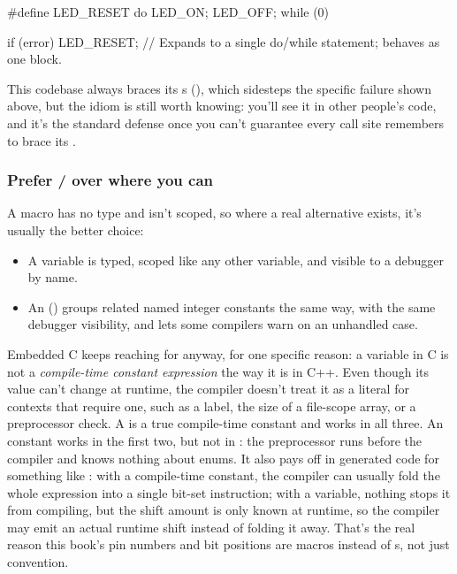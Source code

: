 \begin{ccode}
#define LED_RESET do { LED_ON; LED_OFF; } while (0)

if (error) LED_RESET; // Expands to a single do/while statement; behaves as one block.
\end{ccode}

\noindent This codebase always braces its s (), which sidesteps the
specific failure shown above, but the  idiom is still worth knowing:
you'll see it in other people's code, and it's the standard defense once you can't guarantee every
call site remembers to brace its .

\subsubsection{Prefer / over  where you can}
A macro has no type and isn't scoped, so where a real alternative exists, it's usually the better
choice:
\begin{itemize}
  \item A  variable is typed, scoped like any other variable, and visible to a debugger
    by name.
  \item An  () groups related named integer constants the same way, with
    the same debugger visibility, and lets some compilers warn on an unhandled  case.
\end{itemize}
Embedded C keeps reaching for  anyway, for one specific reason: a 
variable in C is not a \emph{compile-time constant expression} the way it is in C++. Even though
its value can't change at runtime, the compiler doesn't treat it as a literal for contexts that
require one, such as a  label, the size of a file-scope array, or a 
preprocessor check. A  is a true compile-time constant and works in all three. An
 constant works in the first two, but not in : the preprocessor runs before
the compiler and knows nothing about enums. It also pays off in generated code for something like
: with  a compile-time constant, the compiler can usually
fold the whole expression into a single bit-set instruction; with  a
 variable, nothing stops it from compiling, but the shift amount is only known
at runtime, so the compiler may emit an actual runtime shift instead of folding it away. That's the
real reason this book's pin numbers and bit positions are macros instead of s,
not just convention.

